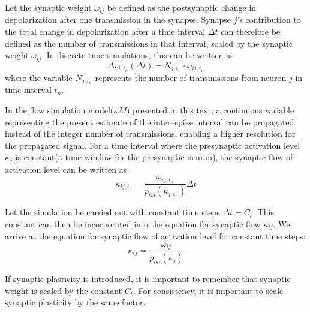 	Let the synaptic weight $\omega_{ij}$ be defined as the postsynaptic change in depolarization after one transmission in the synapse.
	Synapse $j$'s contribution to the total change in depolarization after a time interval $\Delta t$ can therefore be defined as the number of transmissions in that interval, scaled by the synaptic weight $\omega_{ij}$.
	In discrete time simulations, this can be written as
	\begin{equation}
		\Delta v_{i, t_n}(\Delta t) = N_{j,t_n}\cdot\omega_{ij, t_n} %
	\end{equation}
	where the variable $N_{j,t_n}$ represents the number of transmissions from neuron $j$ in time interval $t_n$.

	In the flow simulation model($\kappa M$) presented in this text, a continuous variable representing the present estimate of the inter--spike interval can be propagated instead of the integer number of transmissions,
		enabling a higher resolution for the propagated signal.
	For a time interval where the presynaptic activation level $\kappa_j$ is constant(a time window for the presynaptic neuron), the synaptic flow of activation level can be written as
	\begin{equation}
		\kappa_{ij, t_n} = \frac{ \omega_{ij, t_n} }{ p_{isi}(\kappa_{j, t_n}) } \Delta t %
	\end{equation}

	Let the simulation be carried out with constant time steps $\Delta t = C_t$.
	This constant can then be incorporated into the equation for synaptic flow $\kappa_{ij}$.
	We arrive at the equation for synaptic flow of activation level for constant time steps:
	\begin{equation}
		\kappa_{ij} = \frac{ \omega_{ij} }{ p_{isi}(\kappa_{j})}
		\label{eqSynapticTransmissionForKANN}
	\end{equation}
	
	If synaptic plasticity is introduced, it is important to remember that synaptic weight is scaled by the constant $C_t$.
	For consistency, it is important to scale synaptic plasticity by the same factor.



